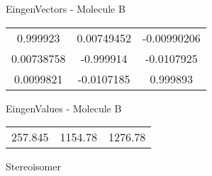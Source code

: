 \begin{multicols}{2}
\begin{center}
\vtab
 EingenVectors - Molecule B     \\
\vtab
\begin{tabular}{|c c c|}
0.999923	 & 	0.00749452	 & 	-0.00990206	 \\
0.00738758	 & 	-0.999914	 & 	-0.0107925	 \\
0.0099821	 & 	-0.0107185	 & 	0.999893
\end{tabular}

\vtab
 EingenValues - Molecule B     \\
\vtab
\begin{tabular}{|c c c|}
257.845	 & 	1154.78	 & 	1276.78	 \\
\end{tabular}

\end{center}
\end{multicols}
\begin{center}
\vtab
\vtab
\textcolor{NavyBlue}{\Large Stereoisomer}
\end{center}

 \newpage

